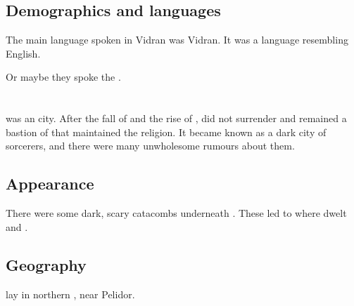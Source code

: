\subsection{Demographics and languages}
The main language spoken in Vidran was Vidran. 
It was a \human language resembling English. 

Or maybe they spoke the .















\section{\Yormis}
\index{\Yormis}
\Yormis was an \Ortaican city.
After the fall of \Ortaica and the rise of \Iquinian \Tepharae, \Yormis did not surrender and remained a bastion of  that maintained the \Ortaican religion.
It became known as a dark city of sorcerers, and there were many unwholesome rumours about them.









\subsection{Appearance}
There were some dark, scary catacombs underneath \Yormis.
These led to \KaiLeng where dwelt \Ubloth and \Thessulax. 










\subsection{Geography}
\Yormis lay in northern \Velcad, near Pelidor.


